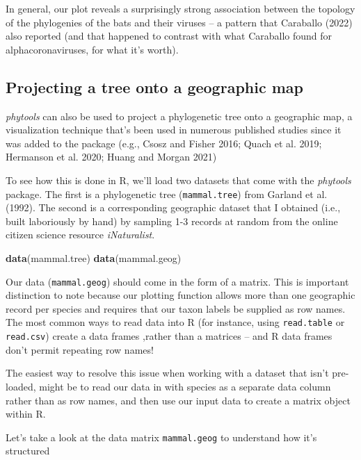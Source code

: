 \documentclass[fleqn,10pt,lineno]{wlpeerj} %
\newenvironment{Shaded}{\begin{snugshade}}{\end{snugshade}}
\newcommand{\FunctionTok}[1]{\textcolor[rgb]{0.13,0.29,0.53}{\textbf{#1}}}
\newcommand{\NormalTok}[1]{#1}
\begin{document}
In general, our plot reveals a surprisingly strong association between the topology of the phylogenies of the bats and their viruses -- a pattern that Caraballo (2022) also reported (and that happened to contrast with what Caraballo found for alphacoronaviruses, for what it's worth).

\hypertarget{projecting-a-tree-onto-a-geographic-map}{%
\subsection{Projecting a tree onto a geographic map}\label{projecting-a-tree-onto-a-geographic-map}}

\emph{phytools} can also be used to project a phylogenetic tree onto a geographic map, a visualization technique that's been used in numerous published studies since it was added to the package (e.g., Csosz and Fisher 2016; Quach et al. 2019; Hermanson et al. 2020; Huang and Morgan 2021)

To see how this is done in R, we'll load two datasets that come with the \emph{phytools} package. The first is a phylogenetic tree (\texttt{mammal.tree}) from Garland et al. (1992). The second is a corresponding geographic dataset that I obtained (i.e., built laboriously by hand) by sampling 1-3 records at random from the online citizen science resource \emph{iNaturalist}.

\begin{Shaded}
\begin{Highlighting}[]
\FunctionTok{data}\NormalTok{(mammal.tree)}
\FunctionTok{data}\NormalTok{(mammal.geog)}
\end{Highlighting}
\end{Shaded}

Our data (\texttt{mammal.geog}) should come in the form of a matrix. This is important distinction to note because our plotting function allows more than one geographic record per species and requires that our taxon labels be supplied as row names. The most common ways to read data into R (for instance, using \texttt{read.table} or \texttt{read.csv}) create a data frames ,rather than a matrices -- and R data frames don't permit repeating row names!

The easiest way to resolve this issue when working with a dataset that isn't pre-loaded, might be to read our data in with species as a separate data column rather than as row names, and then use our input data to create a matrix object within R.

Let's take a look at the data matrix \texttt{mammal.geog} to understand how it's structured
\end{document}
